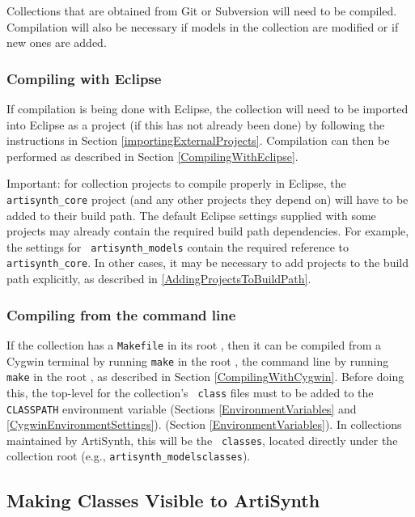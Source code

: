 Collections that are obtained from Git or Subversion will need to be
compiled. Compilation will also be necessary if models in the
collection are modified or if new ones are added.

\subsubsection{Compiling with Eclipse}

If compilation is being done with Eclipse, the collection will need to
be imported into Eclipse as a project (if this has not already been
done) by following the instructions in
Section \ref{importingExternalProjects}.  Compilation can then be
performed as described in Section
\ref{CompilingWithEclipse}.

\begin{sideblock}
Important: for collection projects to compile properly in Eclipse, the
{\tt artisynth\_core} project (and any other projects they depend on)
will have to be added to their build path. The default Eclipse
settings supplied with some projects may already contain the required
build path dependencies. For example, the settings for {\tt
artisynth\_models} contain the required reference to {\tt
artisynth\_core}.  In other cases, it may be necessary to add projects
to the build path explicitly, as described
in \ref{AddingProjectsToBuildPath}.
\end{sideblock}

\subsubsection{Compiling from the command line}

If the collection has a {\tt Makefile} in its root
\directory{}, then it can be compiled from
\ifWindows
a Cygwin terminal by running {\tt make} in the root \directory{},
\else
the command line by running {\tt make} in the root \directory{},
\fi
as described in Section \ref{CompilingWithCygwin}.
Before doing this, the top-level \directory{} for the collection's {\tt
class} files must to be added to the {\tt CLASSPATH} environment
variable
\ifWindows
(Sections \ref{EnvironmentVariables} and \ref{CygwinEnvironmentSettings}).
\else
(Section \ref{EnvironmentVariables}).
\fi
In collections maintained by ArtiSynth, this will be the \directory{} {\tt
classes}, located directly under the collection root \directory{} (e.g.,
{\tt artisynth\_models\SEP classes}).

\subsection{Making Classes Visible to ArtiSynth}
\label{MakingVisible}

